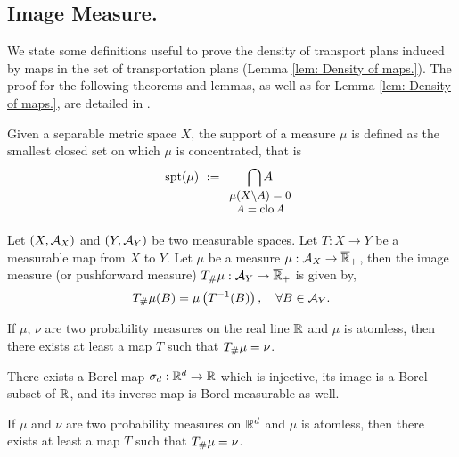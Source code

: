 \subsection{Image Measure.}
We state some definitions useful to prove the density of transport plans induced by maps in the set of transportation plans (Lemma \ref{lem: Density of maps.}). The proof for the following theorems and lemmas, as well as for Lemma \ref{lem: Density of maps.}, are detailed in \cite{Santambrogio2015OT}.
\begin{definition}
	Given a separable metric space $X$, the support of a measure $\mu$ is defined as the smallest closed set on which $\mu$ is concentrated, that is
	\begin{equation}
	\spt(\mu)\ :=\underset{\small{\begin{array}{c}
			\mu(X\backslash A)=0\\ A=\closu A  \end{array}}}{\bigcap A} 		
	\end{equation} 
\end{definition}
\begin{definition}
	Let $\left( X, \mathcal{A}_X \right)$  and $\left( Y, \mathcal{A}_Y \right)$ be two measurable spaces. Let $T:X\rightarrow Y$ be a measurable map from $X$ to $Y$. Let $\mu$ be a measure $\mu: \mathcal{A}_X\rightarrow \overline{\mathbb{R}}_+$, then the image measure (or pushforward measure) ${T}_{\#} \mu:\mathcal{A}_Y\rightarrow \overline{\mathbb{R}}_+$ is given by,
	\begin{equation*}
	{T}_{\#} \mu(B) = \mu\left( T^{-1}(B) \right), \quad \forall B \in \mathcal{A}_Y.
	\end{equation*}
\end{definition}
\begin{lemma}
If $\mu$, $\nu$ are two probability measures on the real line $\mathbb{R}$ and $\mu$ is atomless, then there exists at least a map $T$ such that ${T}_{\#} \mu=\nu$.
\end{lemma}
	
\begin{lemma}
There exists a Borel map $\sigma_d: \mathbb{R}^d\rightarrow \mathbb{R}$ which is injective, its image is a Borel subset of $\mathbb{R}$, and its inverse map is Borel measurable as well.
\end{lemma}
		
\begin{theorem}
	If $\mu$ and $\nu$ are two probability measures on $\mathbb{R}^d$ and $\mu$ is atomless, then there exists at least a map $T$ such that ${T}_{\#} \mu=\nu$.
\end{theorem}
			
